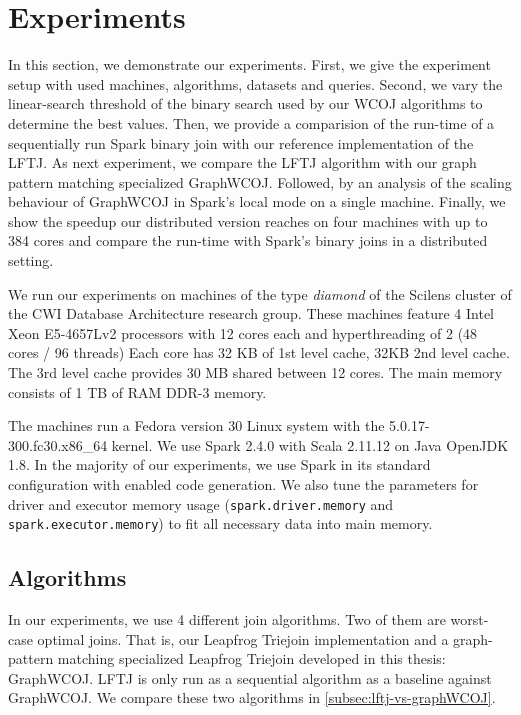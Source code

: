\section{Experiments}\label{sec:experiments}
In this section, we demonstrate our experiments.
First, we give the experiment setup with used machines, algorithms, datasets and queries.
Second, we vary the linear-search threshold of the binary search used by our \textsc{WCOJ}
algorithms to determine the best values.
Then, we provide a comparision of the run-time of a sequentially run Spark binary join with our
reference implementation of the \textsc{LFTJ}.
As next experiment, we compare the \textsc{LFTJ} algorithm with our graph pattern matching
specialized GraphWCOJ.
Followed, by an analysis of the scaling behaviour of GraphWCOJ in Spark's local mode on
a single machine.
Finally, we show the speedup our distributed version reaches on four machines with up
to 384 cores and compare the run-time with Spark's binary joins in a distributed setting.

We run our experiments on machines of the type \textit{diamond} of the Scilens cluster of the CWI Database Architecture research
group.
These machines feature 4 Intel Xeon E5-4657Lv2 processors with 12 cores each and hyperthreading of 2 (48 cores / 96 threads)
Each core has 32 KB of 1st level cache, 32KB 2nd level cache.
The 3rd level cache provides 30 MB shared between 12 cores.
The main memory consists of 1 TB of RAM DDR-3 memory.

The machines run a Fedora version 30 Linux system with the 5.0.17-300.fc30.x86\_64 kernel.
We use Spark 2.4.0 with Scala 2.11.12 on Java OpenJDK 1.8.
In the majority of our experiments, we use Spark in its standard configuration with enabled code generation.
We also tune the parameters for driver and executor memory usage (\texttt{spark.driver.memory} and \texttt{spark.executor.memory}) to fit
all necessary data into main memory.

\subsection{Algorithms}
In our experiments, we use 4 different join algorithms.
Two of them are worst-case optimal joins.
That is, our Leapfrog Triejoin implementation and a graph-pattern matching
specialized Leapfrog Triejoin developed in this thesis: Graph\textsc{WCOJ}.
LFTJ is only run as a sequential algorithm as a baseline against GraphWCOJ.
We compare these two algorithms in \cref{subsec:lftj-vs-graphWCOJ}.

